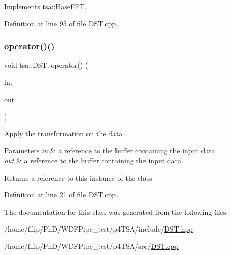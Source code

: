 Implements \hyperlink{classtsa_1_1_base_f_f_t_a9af0c36413173821cac8dbdce9cfe3b4}{tsa\+::\+Base\+F\+FT}.



Definition at line 95 of file D\+S\+T.\+cpp.

\mbox{\label{classtsa_1_1_d_s_t_a98927f7365561b6af059465598eb3445}} 
\subsubsection{\texorpdfstring{operator()()}{operator()()}}
{\footnotesize\ttfamily void tsa\+::\+D\+S\+T\+::operator() (\begin{DoxyParamCaption}\item[{\hyperlink{namespacetsa_ac599574bcc094eda25613724b8f3ca9e}{Seq\+View\+Double} \&}]{in,  }\item[{\hyperlink{namespacetsa_ac599574bcc094eda25613724b8f3ca9e}{Seq\+View\+Double} \&}]{out }\end{DoxyParamCaption})}

Apply the transformation on the data


\begin{DoxyParams}{Parameters}
{\em in} & a reference to the buffer containing the input data \\
\hline
{\em out} & a reference to the buffer containing the input data\\
\hline
\end{DoxyParams}
\begin{DoxyReturn}{Returns}
a reference to this instance of the class 
\end{DoxyReturn}


Definition at line 21 of file D\+S\+T.\+cpp.



The documentation for this class was generated from the following files\+:\begin{DoxyCompactItemize}
\item 
/home/filip/\+Ph\+D/\+W\+D\+F\+Pipe\+\_\+test/p4\+T\+S\+A/include/\hyperlink{_d_s_t_8hpp}{D\+S\+T.\+hpp}\item 
/home/filip/\+Ph\+D/\+W\+D\+F\+Pipe\+\_\+test/p4\+T\+S\+A/src/\hyperlink{_d_s_t_8cpp}{D\+S\+T.\+cpp}\end{DoxyCompactItemize}
